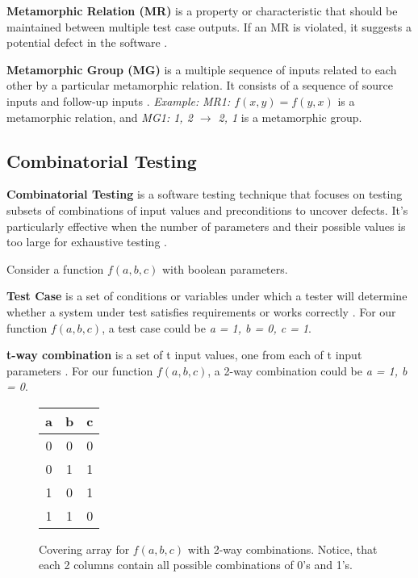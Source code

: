 \textbf{Metamorphic Relation (MR)} is a property or characteristic that should be maintained between multiple test case outputs.
If an MR is violated, it suggests a potential defect in the software \cite{MetamorphicTestingReview}.

\textbf{Metamorphic Group (MG)} is a multiple sequence of inputs related to each other by a particular metamorphic relation.
It consists of a sequence of source inputs and follow-up inputs \cite{MetamorphicTestingReview}. \textit{Example:} \textit{MR1: $f(x, y) = f(y, x)$} is a metamorphic relation, and \textit{MG1: {1, 2} $\rightarrow$ {2, 1}} is a metamorphic group.

\subsection{Combinatorial Testing}\label{subsec:combinatorial-testing}

\textbf{Combinatorial Testing} is a software testing technique that focuses on testing subsets of combinations of input values and preconditions to uncover defects.
It's particularly effective when the number of parameters and their possible values is too large for exhaustive testing \cite{FELDERER20161}.

Consider a function $f(a, b, c)$ with boolean parameters.

\textbf{Test Case} is a set of conditions or variables under which a tester will determine whether a system under test satisfies requirements or works correctly \cite{comer}.
For our function $f(a, b, c)$, a test case could be \textit{a = 1, b = 0, c = 1}.

\textbf{t-way combination} is a set of t input values, one from each of t input parameters \cite{comer}.
For our function $f(a, b, c)$, a 2-way combination could be \textit{a = 1, b = 0}.

\begin{figure}
    \centering
    \begin{tabular}{|c|c|c|}
        \hline
        a & b & c \\
        \hline
        0 & 0 & 0 \\
        0 & 1 & 1 \\
        1 & 0 & 1 \\
        1 & 1 & 0 \\
        \hline
    \end{tabular}
    \caption{Covering array for $f(a, b, c)$ with 2-way combinations. Notice, that each 2 columns contain all possible combinations of 0's and 1's.}
    \label{fig:CovArray}
\end{figure}

